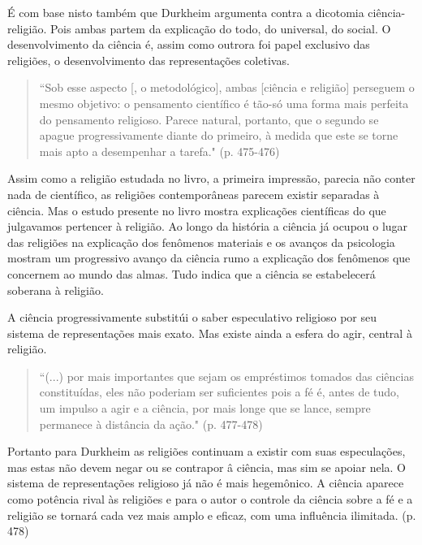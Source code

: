 \documentclass[12pt,a4paper]{article}
\begin{document}
É com base nisto também que Durkheim argumenta contra a dicotomia ciência-religião. Pois ambas partem da explicação do todo, do universal, do social. O desenvolvimento da ciência é, assim como outrora foi papel exclusivo das religiões, o desenvolvimento das representações coletivas.

\begin{quote}
``Sob esse aspecto [, o metodológico], ambas [ciência e religião] perseguem o mesmo objetivo: o pensamento científico é tão-só uma forma mais perfeita do pensamento religioso. Parece natural, portanto, que o segundo se apague progressivamente diante do primeiro, à medida que este se torne mais apto a desempenhar a tarefa."
(p. 475-476)
\end{quote}

Assim como a religião estudada no livro, a primeira impressão, parecia não conter nada de científico, as religiões contemporâneas parecem existir separadas à ciência. Mas o estudo presente no livro mostra explicações científicas do que julgavamos pertencer à religião. Ao longo da história a ciência já ocupou o lugar das religiões na explicação dos fenômenos materiais e os avanços da psicologia mostram um progressivo avanço da ciência rumo a explicação dos fenômenos que concernem ao mundo das almas. Tudo indica que a ciência se estabelecerá soberana à religião.

A ciência progressivamente substitúi o saber especulativo religioso por seu sistema de representações mais exato. Mas existe ainda a esfera do agir, central à religião.

\begin{quote}
``(...) por mais importantes que sejam os empréstimos tomados das ciências constituídas, eles não poderiam ser suficientes pois a fé é, antes de tudo, um impulso a agir e a ciência, por mais longe que se lance, sempre permanece à distância da ação."
 (p. 477-478)
\end{quote}

Portanto para Durkheim as religiões continuam a existir com suas especulações, mas estas não devem negar ou se contrapor â ciência, mas sim se apoiar nela. O sistema de representações religioso já não é mais hegemônico. A ciência aparece como potência rival às religiões e para o autor o controle da ciência sobre a fé e a religião se tornará cada vez mais amplo e eficaz, com uma influência ilimitada. (p. 478)
\end{document}
